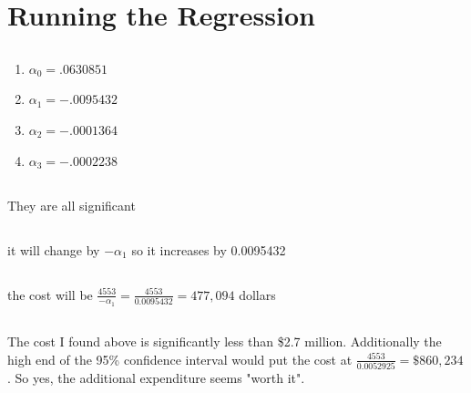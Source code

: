 \documentclass[11pt]{article}
\begin{document}
\section{Running the Regression}
\subsection{}
\begin{enumerate}
	\item $\alpha_0 = .0630851$
	\item $\alpha_1 = -.0095432 $
	\item $\alpha_2 = -.0001364 $
	\item  $\alpha_3 = -.0002238  $
\end{enumerate}

\subsection{}
They are all significant 

\subsection{}
it will change by $-\alpha_1$ so it increases by 0.0095432

\subsection{}
the cost will be $  \frac{4553}{-\alpha_1} =\frac{4553}{0.0095432} = 477,094$  dollars

\subsection{}
The cost I found above is significantly less than \$2.7 million. Additionally the high end of the 95\% confidence interval would put the cost at $ \frac{4553}{0.0052925} = \$ 860,234$. So yes, the additional expenditure seems "worth it". 

\subsection{}
\end{document}
